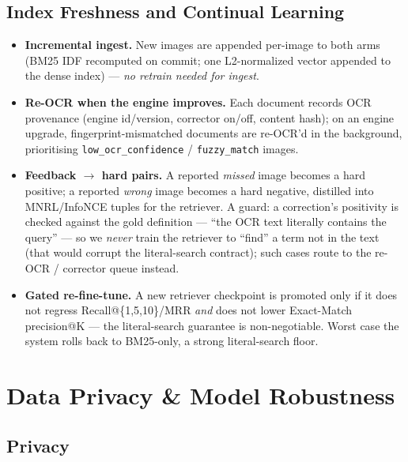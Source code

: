 \documentclass[12pt,a4paper]{article}
\begin{document}
\subsection{Index Freshness and Continual Learning}

\begin{itemize}\setlength\itemsep{0.12em}
  \item \textbf{Incremental ingest.} New images are appended per-image to both arms (BM25 IDF recomputed on commit; one L2-normalized vector appended to the dense index) --- \emph{no retrain needed for ingest}.
  \item \textbf{Re-OCR when the engine improves.} Each document records OCR provenance (engine id/version, corrector on/off, content hash); on an engine upgrade, fingerprint-mismatched documents are re-OCR'd in the background, prioritising \texttt{low\_ocr\_confidence} / \texttt{fuzzy\_match} images.
  \item \textbf{Feedback $\rightarrow$ hard pairs.} A reported \emph{missed} image becomes a hard positive; a reported \emph{wrong} image becomes a hard negative, distilled into MNRL/InfoNCE tuples for the retriever. A guard: a correction's positivity is checked against the gold definition --- ``the OCR text literally contains the query'' --- so we \emph{never} train the retriever to ``find'' a term not in the text (that would corrupt the literal-search contract); such cases route to the re-OCR / corrector queue instead.
  \item \textbf{Gated re-fine-tune.} A new retriever checkpoint is promoted only if it does not regress Recall@\{1,5,10\}/MRR \emph{and} does not lower Exact-Match precision@K --- the literal-search guarantee is non-negotiable. Worst case the system rolls back to BM25-only, a strong literal-search floor.
\end{itemize}

\section{Data Privacy \& Model Robustness}

\subsection{Privacy}
\end{document}
